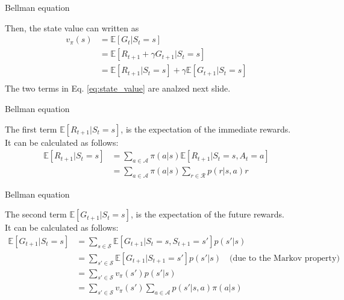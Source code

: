 \documentclass[aspectratio=169,xcolor=dvipsnames]{beamer}
\begin{document}
\begin{frame}{Bellman equation}


Then, the state value can written as
\begin{equation} \label{eq:state_value}
	\begin{aligned}
		v_\pi(s)
		&= \mathbb{E}[G_t | S_t = s] \\
		&= \mathbb{E}[R_{t + 1} + \gamma G_{t + 1} | S_t = s] \\
		&= \mathbb{E}[R_{t + 1} | S_t = s] + \gamma \mathbb{E}[G_{t + 1} | S_t = s] \\
	\end{aligned}
\end{equation}
The two terms in Eq. \ref{eq:state_value} are analzed next slide.

\end{frame}

\begin{frame}{Bellman equation}

The first term $\mathbb{E}[R_{t + 1} | S_t = s]$, is the expectation of the immediate rewards. \\
It can be calculated as follows:
\begin{equation} \label{eq:immediate_rewards}
	\begin{aligned}
		\mathbb{E}[R_{t + 1} | S_t = s]
		&= \sum_{a \in \mathcal{A}} \pi(a|s) \mathbb{E}[R_{t + 1} | S_t = s, A_t = a] \\
		&= \sum_{a \in \mathcal{A}} \pi(a|s) \sum_{r \in \mathcal{R}} p(r|s, a) r
	\end{aligned}
\end{equation}

\end{frame}

\begin{frame}{Bellman equation}


The second term $\mathbb{E}[G_{t + 1} | S_t = s]$, is the expectation of the future rewards. \\
It can be calculated as follows:
\begin{equation} \label{eq:future_rewards}
	\begin{aligned}
		\mathbb{E}[G_{t + 1} | S_t = s]
		&= \sum_{s \in \mathcal{S}} \mathbb{E}[G_{t + 1} | S_t = s, S_{t + 1} = s'] p(s'|s) \\
		&= \sum_{s' \in \mathcal{S}} \mathbb{E}[G_{t + 1} | S_{t + 1} = s'] p(s'|s) \quad \text{(due to the Markov property)} \\
		&= \sum_{s' \in \mathcal{S}} v_\pi(s') p(s'|s) \\
		&= \sum_{s' \in \mathcal{S}} v_\pi(s') \sum_{a \in \mathcal{A}} p(s'|s, a) \pi(a|s) \\
	\end{aligned}
\end{equation}

\end{frame}
\end{document}
